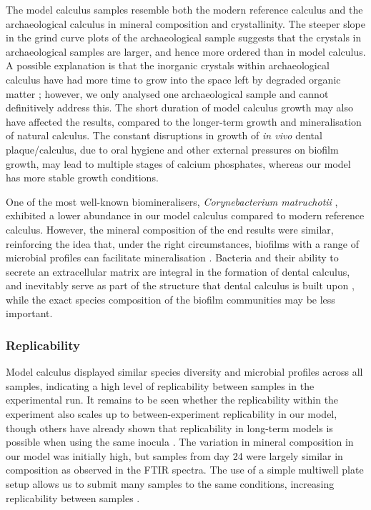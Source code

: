 \documentclass[10pt,a4paper]{article}
\begin{document}
The model calculus samples resemble both the modern reference calculus
and the archaeological calculus in mineral composition and
crystallinity. The steeper slope in the grind curve plots of the
archaeological sample suggests that the crystals in archaeological
samples are larger, and hence more ordered than in model calculus. A
possible explanation is that the inorganic crystals within
archaeological calculus have had more time to grow into the space left
by degraded organic matter \citep{weinerBiologicalMaterials2010};
however, we only analysed one archaeological sample and cannot
definitively address this. The short duration of model calculus growth
may also have affected the results, compared to the longer-term growth
and mineralisation of natural calculus. The constant disruptions in
growth of \emph{in vivo} dental plaque/calculus, due to oral hygiene and
other external pressures on biofilm growth, may lead to multiple stages
of calcium phosphates, whereas our model has more stable growth
conditions.

One of the most well-known biomineralisers, \emph{Corynebacterium
matruchotii}
\citep{enneverCharacterizationBacterionema1978, takazoeCalciumHydroxyapatite1970},
exhibited a lower abundance in our model calculus compared to modern
reference calculus. However, the mineral composition of the end results
were similar, reinforcing the idea that, under the right circumstances,
biofilms with a range of microbial profiles can facilitate
mineralisation \citep{moorerCalcificationCariogenic1993}. Bacteria and
their ability to secrete an extracellular matrix are integral in the
formation of dental calculus, and inevitably serve as part of the
structure that dental calculus is built upon
\citep{rohanizadehUltrastructuralStudy2005}, while the exact species
composition of the biofilm communities may be less important.

\subsubsection{Replicability}\label{replicability}

Model calculus displayed similar species diversity and microbial
profiles across all samples, indicating a high level of replicability
between samples in the experimental run. It remains to be seen whether
the replicability within the experiment also scales up to
between-experiment replicability in our model, though others have
already shown that replicability in long-term models is possible when
using the same inocula \citep{velskoConsistentReproducible2018}. The
variation in mineral composition in our model was initially high, but
samples from day 24 were largely similar in composition as observed in
the FTIR spectra. The use of a simple multiwell plate setup allows us to
submit many samples to the same conditions, increasing replicability
between samples \citep{extercateAAA2010}.
\end{document}
